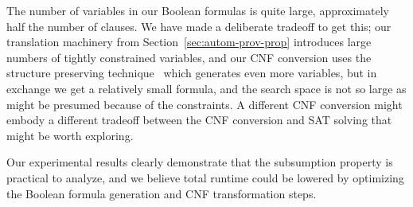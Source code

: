 The number of variables in our Boolean formulas is quite large,
approximately half the number of clauses.  We have made a deliberate
tradeoff to get this; our translation machinery from
Section~\ref{sec:autom-prov-prop} introduces large numbers of tightly
constrained variables, and our CNF conversion uses the structure
preserving technique~\cite{plaisted86structure} which generates even
more variables, but in exchange we get a relatively small formula, and
the search space is not so large as might be presumed because of the
constraints.  A different CNF conversion might embody a different
tradeoff between the CNF conversion and SAT solving that might be
worth exploring.

Our experimental results clearly demonstrate that the subsumption
property is practical to analyze, and we believe total runtime could
be lowered by optimizing the Boolean formula generation and CNF
transformation steps.


